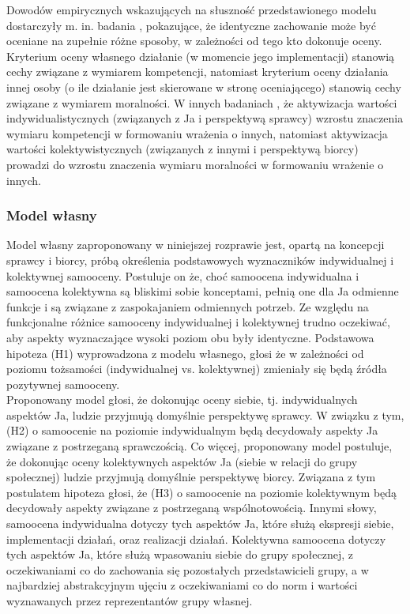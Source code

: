 \documentclass[man]{apa6}
\begin{document}
Dowodów empirycznych wskazujących na słuszność przedstawionego modelu dostarczyły m. in. badania \textcite{wojciszke1994multiple}, pokazujące, że identyczne zachowanie może być oceniane na zupełnie różne sposoby, w zależności od tego kto dokonuje oceny. Kryterium oceny własnego działanie (w momencie jego implementacji) stanowią cechy związane z wymiarem kompetencji, natomiast kryterium oceny działania innej osoby (o ile działanie jest skierowane w stronę oceniającego) stanowią cechy związane z wymiarem moralności. W innych badaniach \parencite{wojciszke1997parallels}, że aktywizacja wartości indywidualistycznych (związanych z Ja i perspektywą sprawcy) wzrostu znaczenia wymiaru kompetencji w formowaniu wrażenia o innych, natomiast aktywizacja wartości kolektywistycznych (związanych z innymi i perspektywą biorcy) prowadzi do wzrostu znaczenia wymiaru moralności w formowaniu wrażenie o innych.\\

\subsubsection{Model własny}
Model własny zaproponowany w niniejszej rozprawie jest, opartą na koncepcji sprawcy i biorcy, próbą określenia podstawowych wyznaczników indywidualnej i kolektywnej samooceny. Postuluje on że, choć samoocena indywidualna i samoocena kolektywna są bliskimi sobie konceptami, pełnią one dla Ja odmienne funkcje i są związane z zaspokajaniem odmiennych potrzeb. Ze względu na funkcjonalne różnice samooceny indywidualnej i kolektywnej trudno oczekiwać, aby aspekty wyznaczające wysoki poziom obu były identyczne. Podstawowa hipoteza (H1) wyprowadzona z modelu własnego, głosi że w zależności od poziomu tożsamości (indywidualnej vs. kolektywnej) zmieniały się będą źródła pozytywnej samooceny.\\

Proponowany model głosi, że dokonując oceny siebie, tj. indywidualnych aspektów Ja, ludzie przyjmują domyślnie perspektywę sprawcy. W związku z tym, (H2) o samoocenie na poziomie indywidualnym będą decydowały aspekty Ja związane z postrzeganą sprawczością. Co więcej, proponowany model postuluje, że dokonując oceny kolektywnych aspektów Ja (siebie w relacji do grupy społecznej) ludzie przyjmują domyślnie perspektywę biorcy. Związana z tym postulatem hipoteza głosi, że (H3) o samoocenie na poziomie kolektywnym będą decydowały aspekty związane z postrzeganą wspólnotowością. Innymi słowy, samoocena indywidualna dotyczy tych aspektów Ja, które służą ekspresji siebie, implementacji działań, oraz realizacji działań. Kolektywna samoocena dotyczy tych aspektów Ja, które służą wpasowaniu siebie do grupy społecznej, z oczekiwaniami co do zachowania się pozostałych przedstawicieli grupy, a w najbardziej abstrakcyjnym ujęciu z oczekiwaniami co do norm i wartości wyznawanych przez reprezentantów grupy własnej.\\
\end{document}
